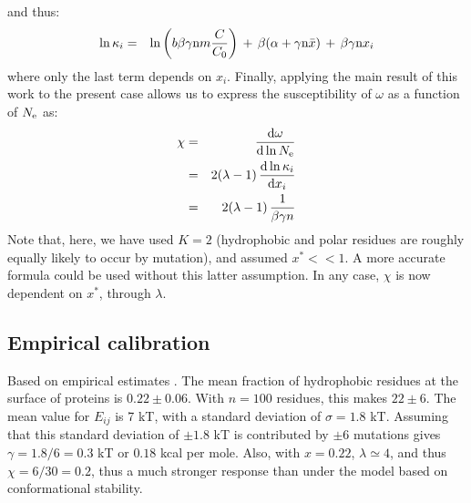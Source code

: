 \documentclass{article}
\begin{document}
and thus:
\begin{eqnarray}
\ln \kappa_i &=& \ln \left( b \beta \gamma \text{n} m \frac{C}{C_0}  \right) \, + \, \beta (\alpha +\gamma \text{n} \bar x) \, + \, \beta \gamma\text{n} x_i
\end{eqnarray}
where only the last term depends on $x_i$.
Finally, applying the main result of this work to the present case allows us to express the susceptibility of $\omega$ as a function of $N_{\mathrm{e}}$ as:
\begin{eqnarray}
\chi &=& \frac{\mathrm{d}\omega} {\mathrm{d} \ln N_{\mathrm{e}}} 
\\ &=&  2(\lambda - 1) \, \frac{\mathrm{d}\ln \kappa_i}{\mathrm{d} x_i} 
\\ &=&  2 (\lambda - 1) \, \frac{1}{\beta \gamma n}
\end{eqnarray}
Note that, here, we have used $K=2$ (hydrophobic and polar residues are roughly equally likely to occur by mutation), and assumed $x^* << 1$. A more accurate formula could be used without this latter assumption. In any case, $\chi$ is now dependent on $x^*$, through $\lambda$.
\subsection{Empirical calibration}
Based on empirical estimates \citep{Zhang2008}. The mean fraction of hydrophobic residues at the surface of proteins is $0.22 \pm 0.06$. With $n=100$ residues, this makes $22 \pm 6$. The mean value for $E_{ij}$ is 7 kT, with a standard deviation of $\sigma = 1.8$ kT. Assuming that this standard deviation of $\pm 1.8$ kT is contributed by $\pm 6$ mutations gives $\gamma = 1.8 / 6 = 0.3$ kT or $0.18$ kcal per mole. Also, with $x=0.22$, $\lambda \simeq 4$, and thus $\chi = 6  / 30 = 0.2$, thus a much stronger response than under the model based on conformational stability.
\end{document}
